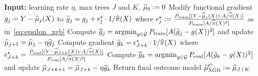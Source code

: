 \begin{algorithm}[t]
\caption{C-Learner with Gradient Boosted Regression Trees}
\begin{algorithmic}[1]
\State \textbf{Input:} learning rate $\eta$, max trees $J$ and $K$, $\widehat{\mu}_0 := 0$
    \State Modify functional gradient $g_j = Y - \widehat{\mu}_j(X)$ to $\widetilde{g}_j = g_j + \epsilon^\star_j \cdot 1/\widehat{\pi}(X)$ where 
  $\epsilon_j^\star := \tfrac{P_{\rm train} [(Y - \widehat{\mu}_j(X)) \cdot A / \widehat{\pi}(X)]}{P_{\rm train} [A / \widehat{\pi}(X)^2]}$ as in~\eqref{eq:epsilon_xgb}
    \State Compute $\widehat{g}_{j} = \mathop{\rm argmin}_{g\in \mathcal G} P_{\rm train}[A( \widetilde{g}_j - g(X))^2]$ and update  $\widehat{\mu}_{j+1} = \widehat{\mu}_j - \eta \widehat{g}_{j}$
\EndFor
{}
    \State Compute gradient $\widetilde{g}_k = \epsilon^\star_{J+k} \cdot 1 / \widehat{\pi}(X)$ where $\epsilon_{J+k}^\star =  \tfrac{P_{\rm eval} [(Y - \widehat{\mu}_{J+k}(X)) \cdot A / \widehat{\pi}(X)]}{P_{\rm eval}[A / \widehat{\pi}(X)^2]}$ 
    \State Compute $\widehat{g}_{k} = \mathop{\rm argmin}_{g\in \mathcal G} P_{\rm eval}[A( \widetilde{g}_k - g(X))^2]$ and update  $\widehat{\mu}_{J+k+1} = \widehat{\mu}_{J+k} - \eta \widehat{g}_{k}$
\EndFor
\State Return final outcome model $\widehat{\mu}^C_{\rm XGB} := \widehat{\mu}_{J+K}$
\end{algorithmic}
\label{alg:boosting}
\end{algorithm}


